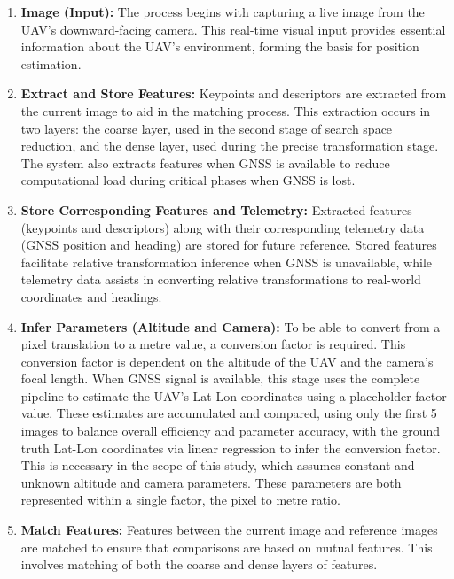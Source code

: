 \begin{enumerate}
    \item \textbf{Image (Input):}  
    The process begins with capturing a live image from the UAV’s downward-facing camera. This real-time visual input provides essential information about the UAV’s environment, forming the basis for position estimation.

    \item \textbf{Extract and Store Features:}  
    Keypoints and descriptors are extracted from the current image to aid in the matching process. This extraction occurs in two layers: the coarse layer, used in the second stage of search space reduction, and the dense layer, used during the precise transformation stage. The system also extracts features when GNSS is available to reduce computational load during critical phases when GNSS is lost.
    
    \item \textbf{Store Corresponding Features and Telemetry:}  
    Extracted features (keypoints and descriptors) along with their corresponding telemetry data (GNSS position and heading) are stored for future reference. Stored features facilitate relative transformation inference when GNSS is unavailable, while telemetry data assists in converting relative transformations to real-world coordinates and headings.

    \item \textbf{Infer Parameters (Altitude and Camera):}  
    To be able to convert from a pixel translation to a metre value, a conversion factor is required. This conversion factor is dependent on the altitude of the UAV and the camera's focal length. When GNSS signal is available, this stage uses the complete pipeline to estimate the UAV's Lat-Lon coordinates using a placeholder factor value. These estimates are accumulated and compared, using only the first 5 images to balance overall efficiency and parameter accuracy, with the ground truth Lat-Lon coordinates via linear regression to infer the conversion factor. This is necessary in the scope of this study, which assumes constant and unknown altitude and camera parameters. These parameters are both represented within a single factor, the pixel to metre ratio. 

    \item \textbf{Match Features:}  
    Features between the current image and reference images are matched to ensure that comparisons are based on mutual features. This involves matching of both the coarse and dense layers of features.


\end{enumerate}
